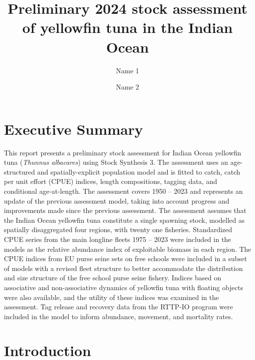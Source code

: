 \documentclass[
]{scrartcl}
\title{Preliminary 2024 stock assessment of yellowfin tuna in the Indian
Ocean}
\author[1,2]{Name 1}
\author[2]{Name 2}
\affil[1]{AZTI, Marine Research, Basque Research and Technology Alliance
(BRTA), Txatxarramendi ugartea z/g, 48395 Sukarrieta (Bizkaia), Spain}
\affil[2]{Affiliation 2}
\date{}
\renewcommand*\contentsname{Table of contents}
\newcommand\contentsname{Table of contents}
\begin{document}
\maketitle

\renewcommand*\contentsname{Contents}
{
\hypersetup{linkcolor=blue}
\setcounter{tocdepth}{3}
\tableofcontents
}
\newpage{}

\section*{Executive Summary}\label{executive-summary}

This report presents a preliminary stock assessment for Indian Ocean
yellowfin tuna (\emph{Thunnus albacares}) using Stock Synthesis 3. The
assessment uses an age-structured and spatially-explicit population
model and is fitted to catch, catch per unit effort (CPUE) indices,
length compositions, tagging data, and conditional age-at-length. The
assessment covers 1950 -- 2023 and represents an update of the previous
assessment model, taking into account progress and improvements made
since the previous assessment. The assessment assumes that the Indian
Ocean yellowfin tuna constitute a single spawning stock, modelled as
spatially disaggregated four regions, with twenty one fisheries.
Standardized CPUE series from the main longline fleets 1975 -- 2023 were
included in the models as the relative abundance index of exploitable
biomass in each region. The CPUE indices from EU purse seine sets on
free schools were included in a subset of models with a revised fleet
structure to better accommodate the distribution and size structure of
the free school purse seine fishery. Indices based on associative and
non-associative dynamics of yellowfin tuna with floating objects were
also available, and the utility of these indices was examined in the
assessment. Tag release and recovery data from the RTTP-IO program were
included in the model to inform abundance, movement, and mortality
rates.

\newpage{}

\section{Introduction}\label{introduction}
\end{document}
